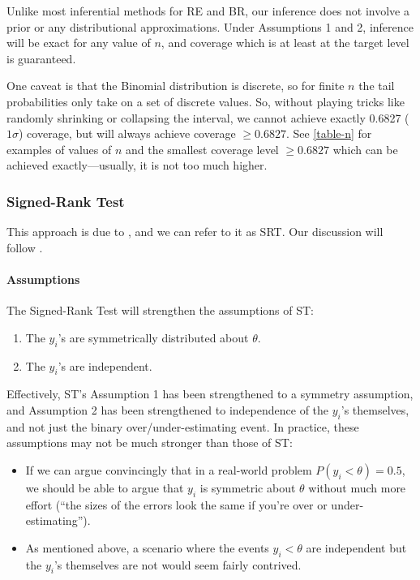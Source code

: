 \documentclass[12pt]{article}
\begin{document}
Unlike most inferential methods for RE and BR, our inference does not involve a prior or any distributional approximations. Under Assumptions 1 and 2, inference will be exact for any value of $n$, and coverage which is at least at the target level is guaranteed.

One caveat is that the Binomial distribution is discrete, so for finite $n$ the tail probabilities only take on a set of discrete values. So, without playing tricks like randomly shrinking or collapsing the interval, we cannot achieve exactly 0.6827 ($1\sigma$) coverage, but will always achieve coverage $\geq 0.6827$. See \ref{table-n} for examples of values of $n$ and the smallest coverage level $\geq0.6827$ which can be achieved exactly---usually, it is not too much higher.

\subsubsection{Signed-Rank Test}\label{signed-rank-test}

This approach is due to \citet{wilcoxon1945individual}, and we can refer to it as SRT. Our discussion will follow \citet[Section 5.7]{conover1999practical}.

\paragraph{Assumptions}\label{assumptions-4}

The Signed-Rank Test will strengthen the assumptions of ST:

\begin{enumerate}
\item
  The $y_i$'s are symmetrically distributed about $\theta$.
\item
  The $y_i$'s are independent.
\end{enumerate}

Effectively, ST's Assumption 1 has been strengthened to a symmetry assumption, and Assumption 2 has been strengthened to independence of the $y_i$'s themselves, and not just the binary over/under-estimating event. In practice, these assumptions may not be much stronger than those of ST:

\begin{itemize}

\item
  If we can argue convincingly that in a real-world problem $P(y_i<\theta)=0.5$, we should be able to argue that $y_i$ is symmetric about $\theta$ without much more effort (``the sizes of the errors look the same if you're over or under-estimating'').
\item
  As mentioned above, a scenario where the events $y_i<\theta$ are independent but the $y_i$'s themselves are not would seem fairly contrived.
\end{itemize}
\end{document}
